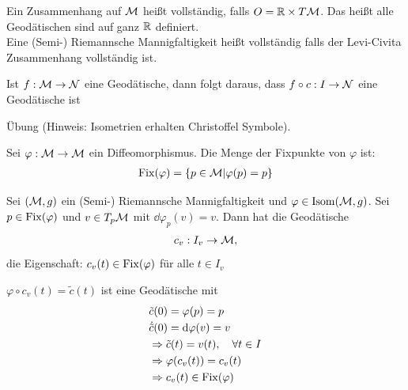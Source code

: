 \begin{defs}[Vollständigkeit]
Ein Zusammenhang auf $\mathcal{M}$ heißt vollständig, falls $O = \mathbb{R} \times T\mathcal{M}$.
Das heißt alle Geodätischen sind auf ganz $\mathbb{R}$ definiert.\\
Eine (Semi-) Riemannsche Mannigfaltigkeit heißt vollständig falls der Levi-Civita Zusammenhang vollständig ist.
\end{defs}
\begin{bem}
Ist $f: \mathcal{M} \to \mathcal{N}$ eine Geodätische, dann folgt daraus, dass $f\circ c: I \to \mathcal{N}$ eine Geodätische ist
\end{bem}
\begin{bew}
Übung (Hinweis: Isometrien erhalten Christoffel Symbole).
\end{bew}
Sei $\varphi : \mathcal{M} \to \mathcal{M}$ ein Diffeomorphismus.
Die Menge der Fixpunkte von $\varphi$ ist:
\begin{align}
\operatorname{Fix} (\varphi) = \{ p \in \mathcal{M} \vert \varphi (p) = p\} 
\end{align}
\begin{satz}
\label{satz:fixpunkte}
Sei $(\mathcal{M}, g)$ ein (Semi-) Riemannsche Mannigfaltigkeit  und $\varphi \in \operatorname{Isom} (\mathcal{M}, g)$.
Sei $p \in \operatorname{Fix} (\varphi)$ und $v \in T_p \mathcal{M}$ mit $\dd \varphi_p (v) = v$.
Dann hat die Geodätische
\begin{align}
c_v : I_v \to \mathcal{M} ,
\end{align}
die Eigenschaft: $c_v(t) \in \operatorname{Fix} (\varphi)$ für alle $t \in I_v$
\end{satz}
\begin{bew}
$\varphi \circ c_v (t) = \tilde{c}(t)$ ist eine Geodätische mit
\begin{align*}
&\tilde{c}(0) = \varphi (p) = p\\
&\dot{\tilde{c}}(0) = \dd \varphi (v) = v\\
&\Rightarrow \tilde{c}(t) = v(t), \quad \forall t \in I\\
&\Rightarrow \varphi (c_v(t)) = c_v (t)\\
&\Rightarrow c_v (t) \in \operatorname{Fix} (\varphi)
\end{align*}
\end{bew}

